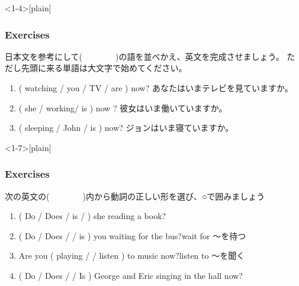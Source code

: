 \documentclass[aspectratio=169,xcolor={dvipsnames,table}]{beamer}
\newcommand{\myaudio}[1]{\href{#1}{\faVolumeUp}}
\begin{document}
\begin{frame}<1-4>[plain]\frametitle{Exercises}

日本文を参考にして(~~~~~~~~)の語を並べかえ、英文を完成させましょう。
ただし先頭に来る単語は大文字で始めてください。



\begin{enumerate}
 \item  ( watching /  you  / TV / are ) now?\hfill%
あなたはいまテレビを見ていますか。\\
 \item ( she / working/ is ) now ?
\hspace{5.3\zw}彼女はいま働いていますか。\\
 \item ( sleeping / John / is ) now?\hspace{4.8\zw}%
ジョンはいま寝ていますか。\\
\end{enumerate}

\mbox{}\hfill{\myaudio{./audio/023_is_ing_question_02.mp3}}
\end{frame}


\begin{frame}<1-7>[plain]\frametitle{Exercises}

次の英文の(~~~~~~~~)内から動詞の正しい形を選び、○で囲みましょう

\begin{enumerate}
 \item ( Do / Does / is /  ) she reading a book?\hspace{10pt}\raisebox{0pt}{\bcbook}
 \item ( Do / Does /  / is ) you waiting for the bus?\hspace{10pt}\hfill{\scriptsize wait for ～を待つ}
 \item Are you ( playing /  / listen ) to music now?\hfill{\scriptsize listen to ～を聞く}\\
\hfill{}
  \item ( Do / Does /  / Is ) George and Eric singing in the hall now?\hspace{10pt}\\
\hfill{}
\end{enumerate}
\pause

\vfill


\mbox{}\hfill{\myaudio{./audio/023_is_ing_question_03.mp3}}


\end{frame}
\end{document}
